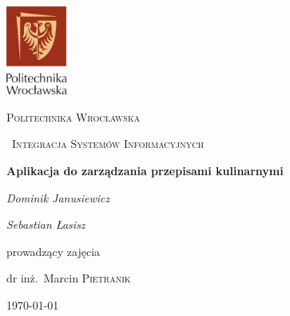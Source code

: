 \documentclass[12pt,a4paper]{report}
\begin{document}
\begin{titlepage}
	\centering
	\includegraphics[width=0.15\textwidth]{logo}\par\vspace{1cm}
	{\scshape\LARGE Politechnika Wrocławska \par}
	\vspace{1cm}
	{\scshape\ Integracja Systemów Informacyjnych\par}
	\vspace{0.5cm}
	{\huge\bfseries  Aplikacja do zarządzania przepisami kulinarnymi\par}
	\vspace{2cm}
	{\Large\itshape Dominik Janusiewicz\par}
	{\Large\itshape Sebastian Łasisz \par}
	\vfill
	prowadzący zajęcia\par
	dr inż.~Marcin \textsc{Pietranik}

	\vfill

	{\large \today\par}
\end{titlepage}
\end{document}
